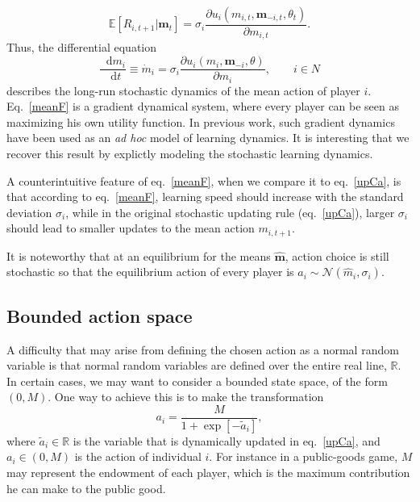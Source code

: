 \documentclass[11pt,reqno]{amsart}
\newcommand{\e}{\theta} %
\newcommand{\ac}{a} %
\newcommand{\de}{\mathop{}\!\mathrm{d}} %
\newcommand{\Esp}{\mathds{E}} %
\newcommand{\Rn}{\mathds{R}} %
\newcommand{\np}{N}%
\newcommand{\tm}{t}%
\newcommand{\pf}{u} %
\newcommand{\ma}{m} %
\newcommand{\sd}{\sigma} %
\newcommand{\Nd}{\mathcal{N}} %
\newcommand{\vma}{\boldsymbol{\ma}} %
\newcommand{\rf}{R} %
\newcommand{\pd}{\partial}
\newcommand{\mx}{M} %
\begin{document}
\begin{equation}
\label{RfExp}
\Esp[\rf_{i,t+1} | \vma_\tm] = \sd_{i}  \frac{\pd \pf_{i}(\ma_{i,\tm},\vma_{-i,\tm},\e_\tm)}{\pd \ma_{i,\tm}}.
\end{equation}
Thus, the differential equation
\begin{equation}
\label{meanF}
\frac{\de \ma_i}{\de \tm} \equiv \dot{\ma}_i = \sd_{i}  \frac{\pd \pf_{i}(\ma_{i},\vma_{-i},\e)}{\pd \ma_{i}}, \qquad i\in\np
\end{equation}
describes the long-run stochastic dynamics of the mean action of player $i$. Eq.~\ref{meanF} is a gradient dynamical system, where every player can be seen as maximizing his own utility function. In previous work, such gradient dynamics have been used as an \emph{ad hoc} model of learning dynamics. It is interesting that we recover this result by explictly modeling the stochastic learning dynamics.

A counterintuitive feature of eq.~\ref{meanF}, when we compare it to eq.~\ref{upCa}, is that according to eq.~\ref{meanF}, learning speed should increase with the standard deviation $\sd_{i}$, while in the original stochastic updating rule (eq.~\ref{upCa}), larger $\sd_{i}$ should lead to smaller updates to the mean action $\ma_{i,\tm+1}$.

It is noteworthy that at an equilibrium for the means $\hat{\vma}$, action choice is still stochastic so that the equilibrium action of every player is $\hat{\ac}_i \sim \Nd(\hat{\ma}_{i},\sd_{i})$.



\subsection{Bounded action space}

A difficulty that may arise from defining the chosen action as a normal random variable is that normal random variables are defined over the entire real line, $\Rn$. In certain cases, we may want to consider a bounded state space, of the form $(0,\mx)$. One way to achieve this is to make the transformation
\begin{equation}
\label{logitTr}
\ac_i = \frac{\mx}{1+ \exp[-\tilde{\ac}_i]},
\end{equation}
where $\tilde{\ac}_i \in \Rn$ is the variable that is dynamically updated in eq.~\ref{upCa}, and $\ac_i \in (0,\mx)$ is the action of individual $i$. For instance in a public-goods game, $\mx$ may represent the endowment of each player, which is the maximum contribution he can make to the public good.
\end{document}
